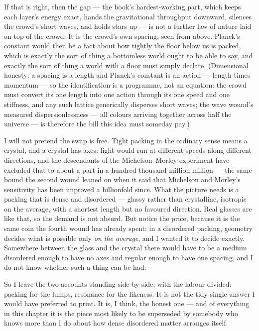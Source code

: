 \documentclass[fontsize=11pt,paper=a4,pagesize=auto,parskip=half-]{scrbook}
\begin{document}
If that is right, then the gap --- the book's hardest-working part, which keeps each layer's energy exact, hands the gravitational throughput downward, silences the crowd's short waves, and holds stars up --- is not a further law of nature laid on top of the crowd. It is the crowd's own spacing, seen from above. Planck's constant would then be a fact about how tightly the floor below us is packed, which is exactly the sort of thing a bottomless world ought to be able to say, and exactly the sort of thing a world with a floor must simply declare. (Dimensional honesty: a spacing is a length and Planck's constant is an action --- length times momentum --- so the identification is a programme, not an equation: the crowd must convert its one length into one action through its one speed and one stiffness, and any such lattice generically disperses short waves; the wave wound's measured dispersionlessness --- all colours arriving together across half the universe --- is therefore the bill this idea must someday pay.)

I will not pretend the swap is free. Tight packing in the ordinary sense means a crystal, and a crystal has axes: light would run at different speeds along different directions, and the descendants of the Michelson--Morley experiment have excluded that to about a part in a hundred thousand million million --- the same bound the second wound leaned on when it said that Michelson and Morley's sensitivity has been improved a billionfold since. What the picture needs is a packing that is dense and disordered --- glassy rather than crystalline, isotropic on the average, with a shortest length but no favoured direction. Real glasses are like that, so the demand is not absurd. But notice the price, because it is the same coin the fourth wound has already spent: in a disordered packing, geometry decides what is possible only \emph{on the average}, and I wanted it to decide exactly. Somewhere between the glass and the crystal there would have to be a medium disordered enough to have no axes and regular enough to have one spacing, and I do not know whether such a thing can be had.

So I leave the two accounts standing side by side, with the labour divided: packing for the lumps, resonance for the likeness. It is not the tidy single answer I would have preferred to print. It is, I think, the honest one --- and of everything in this chapter it is the piece most likely to be superseded by somebody who knows more than I do about how dense disordered matter arranges itself.
\end{document}
